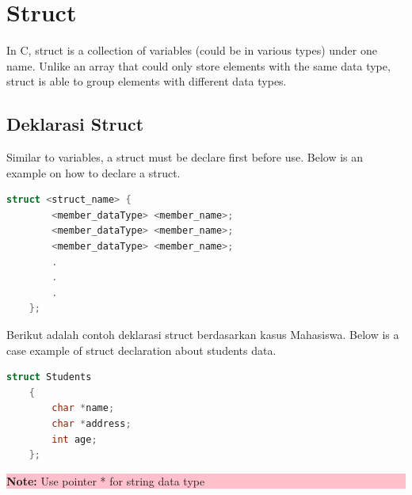 \section{Struct}
In C, struct is a collection of variables (could be in various types) under one name. Unlike an array that could only
store elements with the same data type, struct is able to group elements with different data types.

\subsection{Deklarasi Struct}
Similar to variables, a struct must be declare first before use. Below is an example on how to declare a struct.

\begin{lstlisting}[language=c]
    struct <struct_name> {
        <member_dataType> <member_name>;
        <member_dataType> <member_name>;
        <member_dataType> <member_name>;
        .
        .
        .
    };
    \end{lstlisting}

Berikut adalah contoh deklarasi struct berdasarkan kasus Mahasiswa.
Below is a case example of struct declaration about students data.
\begin{lstlisting}[language=c]
    struct Students
    {
        char *name;
        char *address;
        int age;
    };
    \end{lstlisting}
\begin{center}
    \colorbox{pink}{\parbox{0.8\linewidth}{\textbf{Note:}  Use pointer * for string data type}}
\end{center}


